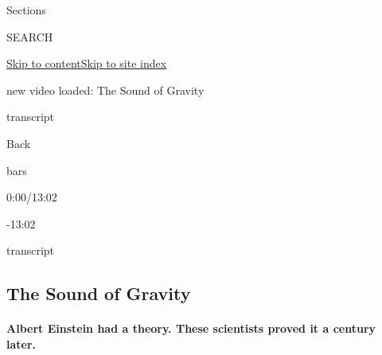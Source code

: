 Sections

SEARCH

\protect\hyperlink{site-content}{Skip to
content}\protect\hyperlink{site-index}{Skip to site index}

new video loaded: The Sound of Gravity

transcript

Back

bars

0:00/13:02

-13:02

transcript

\hypertarget{the-sound-of-gravity}{%
\subsection{The Sound of Gravity}\label{the-sound-of-gravity}}

\hypertarget{albert-einstein-had-a-theory-these-scientists-proved-it-a-century-later}{%
\paragraph{Albert Einstein had a theory. These scientists proved it a
century
later.}\label{albert-einstein-had-a-theory-these-scientists-proved-it-a-century-later}}

